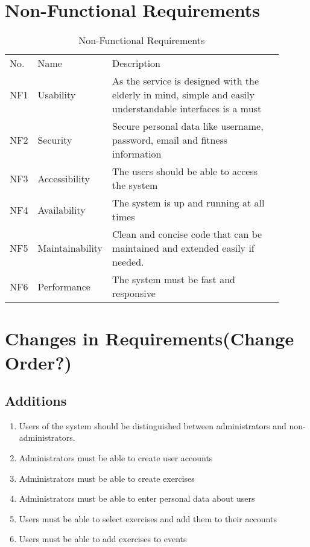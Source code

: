 \section{Non-Functional Requirements}

\begin{table} [H]\centering
    \begin{tabular}{ |C{0.05\linewidth}|C{0.15\linewidth}|L{0.7\linewidth}| } 
 \hline {}
  \\
 \hline
 No. & Name & Description \\
 \hline
 NF1 & Usability & As the service is designed with the elderly in mind, simple and easily understandable interfaces is a must \\ 
 \hline
 NF2 & Security & Secure personal data like username, password, email and fitness information \\ 
  \hline
 NF3 & Accessibility & The users should be able to access the system \\
  \hline
 NF4 & Availability & The system is up and running at all times \\
  \hline
 NF5 & Maintainability & Clean and concise code that can be maintained and extended easily if needed. \\
  \hline
 NF6 & Performance & The system must be fast and responsive \\
 
 \hline
\end{tabular}
\caption{Non-Functional Requirements}
\end{table}

\section{Changes in Requirements(Change Order?)}
\subsection{Additions}
\begin{enumerate}
    \item Users of the system should be distinguished between administrators and non-administrators.
    \item Administrators must be able to create user accounts
    \item Administrators must be able to create exercises
    \item Administrators must be able to enter personal data about users
    \item Users must be able to select exercises and add them to their accounts
    \item Users must be able to add exercises to events
\end{enumerate}

